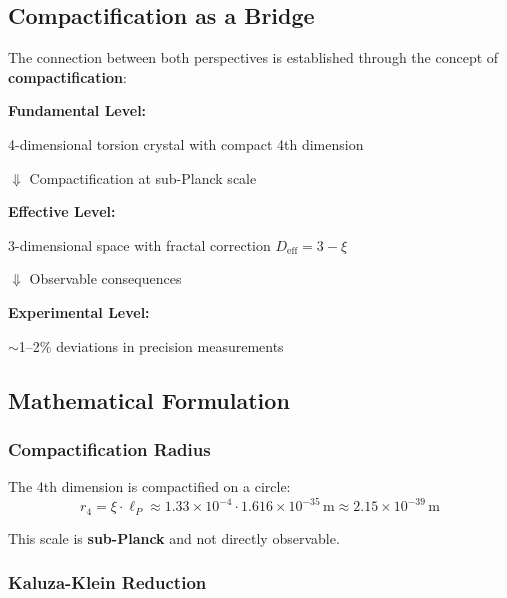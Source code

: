 	\subsection{Compactification as a Bridge}
	
	The connection between both perspectives is established through the concept of \textbf{compactification}:
	
	\begin{keyresult}
		\textbf{Fundamental Level:}
		\begin{center}
			4-dimensional torsion crystal with compact 4th dimension
		\end{center}
		
		$\Downarrow$ \quad Compactification at sub-Planck scale
		
		\textbf{Effective Level:}
		\begin{center}
			3-dimensional space with fractal correction $D_{\text{eff}} = 3 - \xi$
		\end{center}
		
		$\Downarrow$ \quad Observable consequences
		
		\textbf{Experimental Level:}
		\begin{center}
			$\sim$1--2\% deviations in precision measurements
		\end{center}
	\end{keyresult}
	
	\subsection{Mathematical Formulation}
	
	\subsubsection{Compactification Radius}
	
	The 4th dimension is compactified on a circle:
\begin{equation}
	r_4 = \xi \cdot \ell_P \approx 1.33 \times 10^{-4} \cdot 1.616 \times 10^{-35}\,\text{m} \approx 2.15 \times 10^{-39}\,\text{m}
\end{equation}
	
	This scale is \textbf{sub-Planck} and not directly observable.
	
	\subsubsection{Kaluza-Klein Reduction}
	
